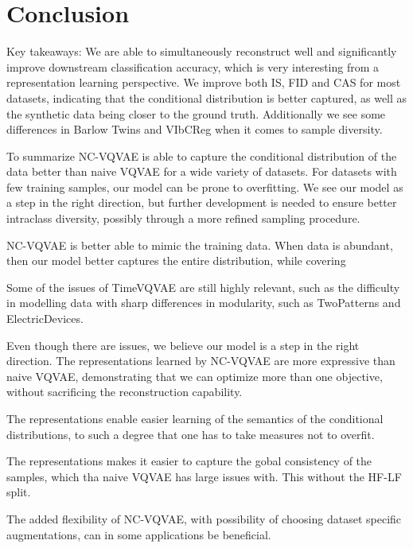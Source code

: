 \documentclass[../../thesis.tex]{subfiles}
\begin{document}
\section{Conclusion}

Key takeaways: We are able to simultaneously reconstruct well and significantly improve downstream classification accuracy, which is very interesting from a representation learning perspective. We improve both IS, FID and CAS for most datasets, indicating that the conditional distribution is better captured, as well as the synthetic data being closer to the ground truth. Additionally we see some differences in Barlow Twins and VIbCReg when it comes to sample diversity.\newline

To summarize NC-VQVAE is able to capture the conditional distribution of the data better than naive VQVAE for a wide variety of datasets. For datasets with few training samples, our model can be prone to overfitting. We see our model as a step in the right direction, but further development is needed to ensure better intraclass diversity, possibly through a more refined sampling procedure. \newline


NC-VQVAE is better able to mimic the training data. When data is abundant, then our model better captures the entire distribution, while covering \newline

Some of the issues of TimeVQVAE are still highly relevant, such as the difficulty in modelling data with sharp differences in modularity, such as TwoPatterns and ElectricDevices.\newline



Even though there are issues, we believe our model is a step in the right direction. The representations learned by NC-VQVAE are more expressive than naive VQVAE, demonstrating that we can optimize more than one objective, without sacrificing the reconstruction capability. 

The representations enable easier learning of the semantics of the conditional distributions, to such a degree that one has to take measures not to overfit. 

The representations makes it easier to capture the gobal consistency of the samples, which tha naive VQVAE has large issues with. This without the HF-LF split.

The added flexibility of NC-VQVAE, with possibility of choosing dataset specific augmentations, can in some applications be beneficial.\newline
\end{document}
